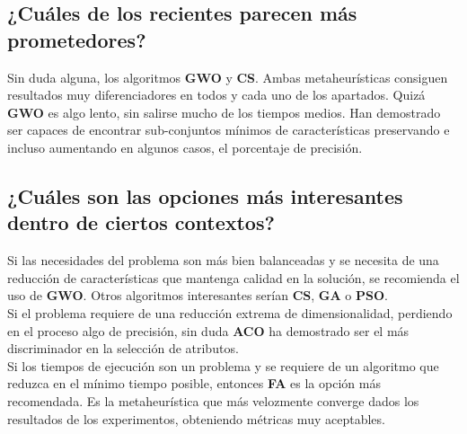 \subsection{¿Cuáles de los recientes parecen más prometedores?}
Sin duda alguna, los algoritmos \textbf{GWO} y \textbf{CS}. Ambas metaheurísticas consiguen resultados muy diferenciadores en todos y cada uno de los apartados. Quizá \textbf{GWO} es algo lento, sin salirse mucho de los tiempos medios. Han demostrado ser capaces de encontrar sub-conjuntos mínimos de características preservando e incluso aumentando en algunos casos, el porcentaje de precisión.
\subsection{¿Cuáles son las opciones más interesantes dentro de ciertos contextos?}
Si las necesidades del problema son más bien balanceadas y se necesita de una reducción de características que mantenga calidad en la solución, se recomienda el uso de \textbf{GWO}. Otros algoritmos interesantes serían \textbf{CS}, \textbf{GA} o \textbf{PSO}.\\[6pt]
Si el problema requiere de una reducción extrema de dimensionalidad, perdiendo en el proceso algo de precisión, sin duda \textbf{ACO} ha demostrado ser el más discriminador en la selección de atributos.\\[6pt]
Si los tiempos de ejecución son un problema y se requiere de un algoritmo que reduzca en el mínimo tiempo posible, entonces \textbf{FA} es la opción más recomendada. Es la metaheurística que más velozmente converge dados los resultados de los experimentos, obteniendo métricas muy aceptables.